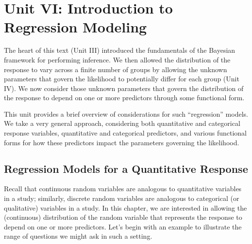 \documentclass[
  letterpaper,
  DIV=11,
  numbers=noendperiod]{scrreprt}
\theoremstyle{definition}
\theoremstyle{definition}
\theoremstyle{plain}
\theoremstyle{remark}
\begin{document}
\part{Unit VI: Introduction to Regression Modeling}

The heart of this text (Unit III) introduced the fundamentals of the
Bayesian framework for performing inference. We then allowed the
distribution of the response to vary across a finite number of groups by
allowing the unknown parameters that govern the likelihood to
potentially differ for each group (Unit IV). We now consider those
unknown parameters that govern the distribution of the response to
depend on one or more predictors through some functional form.

This unit provides a brief overview of considerations for such
``regression'' models. We take a very general approach, considering both
quantitative and categorical response variables, quantitative and
categorical predictors, and various functional forms for how these
predictors impact the parameters governing the likelihood.

\hypertarget{sec-linear-regression}{%
\chapter{Regression Models for a Quantitative
Response}\label{sec-linear-regression}}

\providecommand{\norm}[1]{\lVert#1\rVert}
\providecommand{\abs}[1]{\lvert#1\rvert}
\providecommand{\iid}{\stackrel{\text{IID}}{\sim}}
\providecommand{\ind}{\stackrel{\text{Ind}}{\sim}}

\providecommand{\bm}[1]{\mathbf{#1}}
\providecommand{\bs}[1]{\boldsymbol{#1}}
\providecommand{\bbeta}{\bs{\beta}}

\providecommand{\Ell}{\mathcal{L}}
\providecommand{\indep}{\perp\negthickspace\negmedspace\perp}

Recall that continuous random variables are analogous to quantitative
variables in a study; similarly, discrete random variables are analogous
to categorical (or qualitative) variables in a study. In this chapter,
we are interested in allowing the (continuous) distribution of the
random variable that represents the response to depend on one or more
predictors. Let's begin with an example to illustrate the range of
questions we might ask in such a setting.
\end{document}
